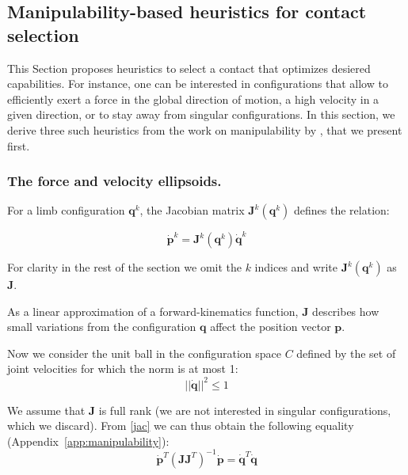 \subsection{Manipulability-based heuristics for contact selection}
This Section proposes heuristics to select a contact that optimizes desiered capabilities.
For instance, one can be interested in configurations that allow to efficiently exert a force in the global direction of motion,
a high velocity in a given direction, or to stay away from singular configurations.
In this section, we derive three such heuristics from the work on manipulability by \cite{Yoshikawa1984}, that we present first.

\subsubsection{The force and velocity ellipsoids.}
For a limb configuration $\mathbf{q}^k$, the Jacobian matrix
 $\mathbf{J}^k(\mathbf{q}^k)$   defines the relation:
 
\begin{equation} \label{jac}
\mathbf{\dot{p}}^k = \mathbf{J}^k(\mathbf{q}^k) \dot{\mathbf{q}}^k
\end{equation}

For clarity in the rest of the section we omit the $k$ indices and write $\mathbf{J}^k(\mathbf{q}^k)$ as $\mathbf{J}$.
 
As a linear approximation of a forward-kinematics function, $\mathbf{J}$ describes how small
variations from the configuration $\mathbf{q}$ affect the position vector $\mathbf{p}$.

Now we consider the unit ball in the configuration space $C$ defined by the set of joint velocities
for which the norm is at most 1:
\begin{equation} \label{ball}
||\dot{\mathbf{q}}||^2 \leq 1
\end{equation}

We assume that $\mathbf{J}$ is full rank (we are not interested in singular configurations, which we discard).
From \eqref{jac} we can thus obtain the following equality (Appendix~\ref{app:manipulability}):
\begin{equation} \label{jaceq}
\mathbf{\dot{p}}^T(\mathbf{J}\mathbf{J}^T)^{-1}\mathbf{\dot{p}} = \dot{\mathbf{q}}^T \dot{\mathbf{q}}
\end{equation}

